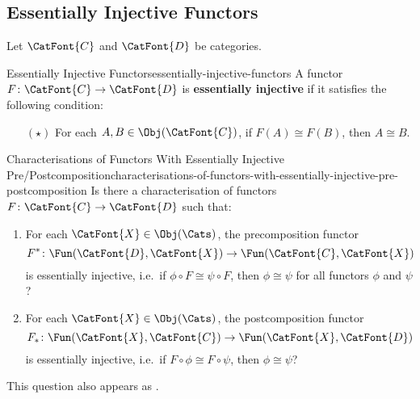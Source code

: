\subsection{Essentially Injective Functors}\label{subsection-essentially-injective-functors}
Let $\CatFont{C}$ and $\CatFont{D}$ be categories.
\begin{definition}{Essentially Injective Functors}{essentially-injective-functors}%
    A functor $F\colon\CatFont{C}\to\CatFont{D}$ is \textbf{essentially injective} if it satisfies the following condition:
    \begin{itemize}%
        \item[$(\star)$]For each $A,B\in\Obj(\CatFont{C})$, if $F(A)\cong F(B)$, then $A\cong B$.
    \end{itemize}%
\end{definition}
\begin{question}{Characterisations of Functors With Essentially Injective Pre/Postcomposition}{characterisations-of-functors-with-essentially-injective-pre-postcomposition}%
    Is there a characterisation of functors $F\colon\CatFont{C}\to\CatFont{D}$ such that:
    \begin{enumerate}
        \item\label{characterisations-of-functors-with-essentially-injective-pre-postcomposition-a}For each $\CatFont{X}\in\Obj(\Cats)$, the precomposition functor
            \[
                F^{*}%
                \colon%
                \Fun(\CatFont{D},\CatFont{X})%
                \to%
                \Fun(\CatFont{C},\CatFont{X})%
            \]%
            is essentially injective, i.e.\ if $\phi\circ F\cong\psi\circ F$, then $\phi\cong\psi$ for all functors $\phi$ and $\psi$?
        \item\label{characterisations-of-functors-with-essentially-injective-pre-postcomposition-b}For each $\CatFont{X}\in\Obj(\Cats)$, the postcomposition functor
            \[
                F_{*}%
                \colon%
                \Fun(\CatFont{X},\CatFont{C})%
                \to%
                \Fun(\CatFont{X},\CatFont{D})%
            \]%
            is essentially injective, i.e.\ if $F\circ\phi\cong F\circ\psi$, then $\phi\cong\psi$?
    \end{enumerate}
    This question also appears as \cite{MO468125}.
\end{question}
